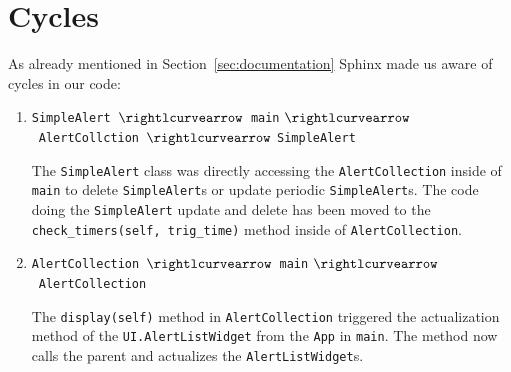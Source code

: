 \section{Cycles}
\label{sec:cycles}

As already mentioned in Section~\ref{sec:documentation} Sphinx made us aware of
cycles in our code:

\begin{enumerate}

    \item \texttt{SimpleAlert}~$\rightlcurvearrow$~\texttt{main}
        $\rightlcurvearrow$~\texttt{AlertCollction}~$\rightlcurvearrow$
        \texttt{SimpleAlert}

        The \texttt{SimpleAlert} class was directly accessing
        the \texttt{AlertCollection} inside of \texttt{main} to
        delete \texttt{SimpleAlert}s or update periodic \texttt{SimpleAlert}s.
        The code doing the \texttt{SimpleAlert} update and delete has been moved
        to the \texttt{check\_timers(self, trig\_time)} method inside of
        \texttt{AlertCollection}.

    \item \texttt{AlertCollection}~$\rightlcurvearrow$~\texttt{main}
        $\rightlcurvearrow$~\texttt{AlertCollection}

        The \texttt{display(self)} method in \texttt{AlertCollection} triggered
        the actualization method of the \texttt{UI.AlertListWidget} from the
        \texttt{App} in \texttt{main}. The method now calls the parent and
        actualizes the \texttt{AlertListWidget}s.

\end{enumerate}


